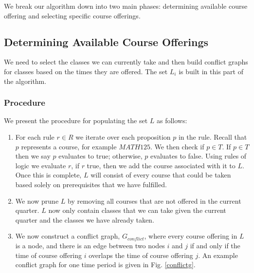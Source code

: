\documentclass[11pt]{article} %
\begin{document}
We break our algorithm down into two main phases: determining available course
offering and selecting specific course offerings.

\subsection{Determining Available Course Offerings} We need to select the
classes we can currently take and then build conflict graphs for classes based
on the times they are offered. The set $L_i$ is built in this part of the
algorithm.

\subsubsection{Procedure} We present the procedure for populating the set $L$ as
follows: \begin{enumerate} \item For each rule $r \in R$ we iterate over each
proposition $p$ in the rule. Recall that $p$ represents a course, for example
$MATH125$. We then check if $p \in T$.  If $p \in T$ then we say $p$ evaluates
to true; otherwise, $p$ evaluates to false.  Using rules of logic we evaluate
$r$, if $r$ true, then we add the course associated with it to $L$.  Once this
is complete, $L$ will consist of every course that could be taken based solely
on prerequisites that we have fulfilled.  \item We now prune $L$ by removing all
courses that are not offered in the current quarter. $L$ now only contain
classes that we can take given the current quarter and the classes we have
already taken.  \item We now construct a conflict graph, $G_{conflict}$, where
every course offering in $L$ is a node, and there is an edge between two nodes
$i$ and $j$ if and only if the time of course offering $i$ overlaps the time of
course offering $j$. An example conflict graph for one time period is given in
Fig. \ref{conflictg}. \end{enumerate} 
\end{document}
